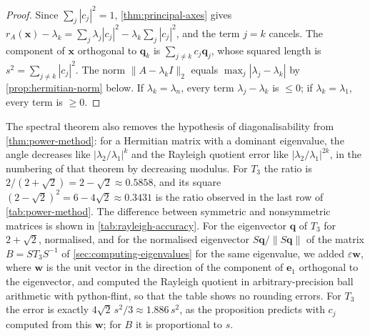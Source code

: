 \begin{proof}
Since $\sum_j|c_j|^2=1$, \cref{thm:principal-axes} gives $r_A(\mathbf x)-\lambda_k=\sum_j\lambda_j|c_j|^2-\lambda_k\sum_j|c_j|^2$, and the term $j=k$ cancels. The component of $\mathbf x$ orthogonal to $\mathbf q_k$ is $\sum_{j\ne k}c_j\mathbf q_j$, whose squared length is $s^2=\sum_{j\ne k}|c_j|^2$. The norm $\|A-\lambda_kI\|_2$ equals $\max_j|\lambda_j-\lambda_k|$ by \cref{prop:hermitian-norm} below. If $\lambda_k=\lambda_n$, every term $\lambda_j-\lambda_k$ is $\le0$; if $\lambda_k=\lambda_1$, every term is $\ge0$.
\end{proof}

The spectral theorem also removes the hypothesis of diagonalisability from \cref{thm:power-method}: for a Hermitian matrix with a dominant eigenvalue, the angle decreases like $|\lambda_2/\lambda_1|^k$ and the Rayleigh quotient error like $|\lambda_2/\lambda_1|^{2k}$, in the numbering of that theorem by decreasing modulus. For $T_3$ the ratio is $2/(2+\sqrt2)=2-\sqrt2\approx0.5858$, and its square $(2-\sqrt2)^2=6-4\sqrt2\approx0.3431$ is the ratio observed in the last row of \cref{tab:power-method}. The difference between symmetric and nonsymmetric matrices is shown in \cref{tab:rayleigh-accuracy}. For the eigenvector $\mathbf q$ of $T_3$ for $2+\sqrt2$, normalised, and for the normalised eigenvector $S\mathbf q/\|S\mathbf q\|$ of the matrix $B=ST_3S^{-1}$ of \cref{sec:computing-eigenvalues} for the same eigenvalue, we added $\varepsilon\mathbf w$, where $\mathbf w$ is the unit vector in the direction of the component of $\mathbf e_1$ orthogonal to the eigenvector, and computed the Rayleigh quotient in arbitrary-precision ball arithmetic with python-flint, so that the table shows no rounding errors. For $T_3$ the error is exactly $4\sqrt2\,s^2/3\approx1.886\,s^2$, as the proposition predicts with $c_j$ computed from this $\mathbf w$; for $B$ it is proportional to $s$.

